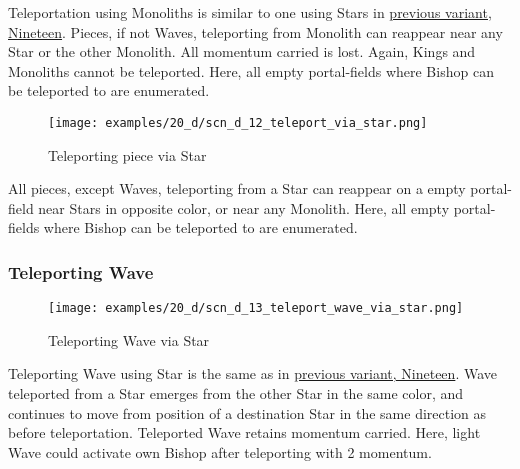 \vspace*{-0.4\baselineskip}
Teleportation using Monoliths is similar to one using Stars in \hyperref[fig:scn_n_02_teleport_init]{previous variant, Nineteen}.
Pieces, if not Waves, teleporting from Monolith can reappear near any Star or the other Monolith.
All momentum carried is lost. Again, Kings and Monoliths cannot be teleported.
Here, all empty portal-fields where Bishop can be teleported to are enumerated.

\clearpage %

\vspace*{-2.3\baselineskip}
\noindent
\begin{figure}[!h]
\texttt{[image: examples/20\_d/scn\_d\_12\_teleport\_via\_star.png]}
\vspace*{-1.3\baselineskip}
\caption{Teleporting piece via Star}
\label{fig:scn_d_12_teleport_via_star}
\end{figure}

\vspace*{-0.4\baselineskip}
All pieces, except Waves, teleporting from a Star can reappear on a empty portal-field
near Stars in opposite color, or near any Monolith.
Here, all empty portal-fields where Bishop can be teleported to are enumerated.

\clearpage %

\subsubsection*{Teleporting Wave}
\label{sec:Discovery/Monolith/Teleporting/Teleporting Wave}

\vspace*{-1.4\baselineskip}
\noindent
\begin{figure}[!h]
\texttt{[image: examples/20\_d/scn\_d\_13\_teleport\_wave\_via\_star.png]}
\vspace*{-1.3\baselineskip}
\caption{Teleporting Wave via Star}
\label{fig:scn_d_13_teleport_wave_via_star}
\end{figure}

\vspace*{-0.4\baselineskip}
Teleporting Wave using Star is the same as in \hyperref[fig:scn_n_04_teleport_move_3]{previous variant, Nineteen}.
Wave teleported from a Star emerges from the other Star in the same color,
and continues to move from position of a destination Star in the same
direction as before teleportation. Teleported Wave retains momentum carried.
Here, light Wave could activate own Bishop after teleporting with 2 momentum.

